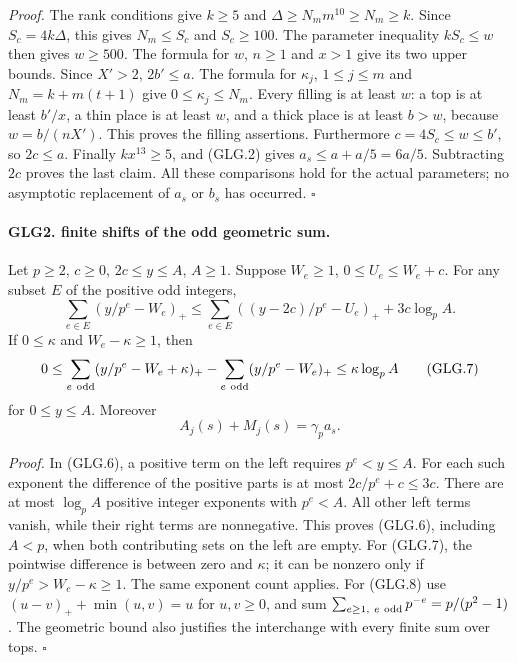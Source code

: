 \documentclass[11pt,a4paper]{article}
\numberwithin{equation}{section}
\theoremstyle{remark}\newtheorem{remark}[theorem]{Remark}
\begin{document}
\emph{Proof.}
The rank conditions give \(k\ge5\) and
\(\Delta\ge N_m m^{10}\ge N_m\ge k\).
Since \(S_c=4k\Delta\), this gives \(N_m\le S_c\) and
\(S_c\ge100\). The parameter inequality \(kS_c\le w\)
then gives \(w\ge500\). The formula for \(w\), \(n\ge1\)
and \(x>1\) give its two upper bounds. Since \(X'>2\),
\(2b'\le a\). The formula for \(\kappa_j\), \(1\le j\le m\)
and \(N_m=k+m(t+1)\) give \(0\le\kappa_j\le N_m\).
Every filling is at least \(w\): a top is at least \(b'/x\),
a thin place is at least \(w\), and a thick place is at least
\(b>w\), because \(w=b/(nX')\). This proves the filling assertions.
Furthermore \(c=4S_c\le w\le b'\), so \(2c\le a\).
Finally \(kx^{13}\ge5\), and (GLG.2) gives
\(a_s\le a+a/5=6a/5\). Subtracting \(2c\) proves the last
claim. All these comparisons hold for the actual parameters;
no asymptotic replacement of \(a_s\) or \(b_s\) has occurred.
\hfill\(\square\)

\paragraph{GLG2. finite shifts of the odd geometric sum.}
\label{claim:GLG2}
Let \(p\ge2\), \(c\ge0\), \(2c\le y\le A\), \(A\ge1\).
Suppose \(W_e\ge1\), \(0\le U_e\le W_e+c\). For any subset
\(E\) of the positive odd integers,
\[
 \sum_{e\in E}(y/p^e-W_e)_+
 \le\sum_{e\in E}((y-2c)/p^e-U_e)_+
                                  +3c\log_p A.                    \tag{GLG.6}
\]
If \(0\le\kappa\) and \(W_e-\kappa\ge1\), then
\[
 0\le\sum_{e\ {\rm odd}}(y/p^e-W_e+\kappa)_+
             -\sum_{e\ {\rm odd}}(y/p^e-W_e)_+
                      \le\kappa\log_p A                           \tag{GLG.7}
\]
for \(0\le y\le A\). Moreover
\[
              A_j(s)+M_j(s)=\gamma_p a_s .                         \tag{GLG.8}
\]

\emph{Proof.}
In (GLG.6), a positive term on the left requires \(p^e<y\le A\).
For each such exponent the difference of the positive parts is at
most \(2c/p^e+c\le3c\). There are at most \(\log_p A\)
positive integer exponents with \(p^e<A\). All other left terms
vanish, while their right terms are nonnegative. This proves
(GLG.6), including \(A<p\), when both contributing sets on the left
are empty. For (GLG.7), the pointwise difference is between zero
and \(\kappa\); it can be nonzero only if
\(y/p^e>W_e-\kappa\ge1\). The same exponent count applies.
For (GLG.8) use
\((u-v)_++\min(u,v)=u\) for \(u,v\ge0\), and sum
\(\sum_{e\ge1,\ e\ {\rm odd}}p^{-e}=p/(p^2-1)\).
The geometric bound also justifies the interchange with every
finite sum over tops.
\hfill\(\square\)
\end{document}
